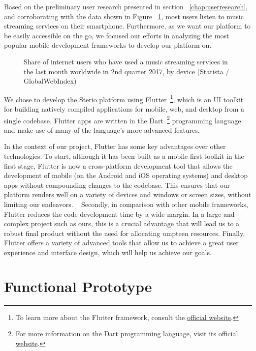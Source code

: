 Based on the preliminary user research presented in section ~\ref{chap:userresearch}, and corroborating with the data shown in Figure ~\ref{chart:devices}, most users listen to music streaming services on their smartphone. Furthermore, as we want our platform to be easily accessible on the go, we focused our efforts in analyzing the most popular mobile development frameworks to develop our platform on.

\begin{figure}
	\centering
	\caption{Share of internet users who have used a music streaming services in the last month worldwide in 2nd quarter 2017, by device (Statista / GlobalWebIndex)}
	\label{chart:devices}
	\begin{bchart}[step=10,max=45,unit=\%,width=0.8\textwidth]
            \smallskip
            \smallskip
    \end{bchart}
\end{figure}


We chose to develop the Sterio platform using Flutter~\footnote{To learn more about the Flutter framework, consult the \href{https://flutter.dev/}{official website}.}, which is an \ac{UI} toolkit for building natively compiled applications for mobile, web, and desktop from a single codebase. Flutter apps are written in the Dart~\footnote{For more information on the Dart programming language, visit its \href{https://dart.dev/}{official website}.} programming language and make use of many of the language's more advanced features. ~\cite{Payne2019}

In the context of our project, Flutter has some key advantages over other technologies. To start, although it has been built as a mobile-first toolkit in the first stage, Flutter is now a cross-platform development tool that allows the development of mobile (on the Android and iOS operating systems) and desktop apps without compounding changes to the codebase. This ensures that our platform renders well on a variety of devices and windows or screen sizes, without limiting our endeavors. ~\cite{H.GillbertMiller2011} Secondly, in comparison with other mobile frameworks, Flutter reduces the code development time by a wide margin. In a large and complex project such as ours, this is a crucial advantage that will lead us to a robust final product without the need for allocating umpteen resources. Finally, Flutter offers a variety of advanced tools that allow us to achieve a great user experience and interface design, which will help us achieve our goals. ~\cite{Payne2019}


\section{Functional Prototype}
